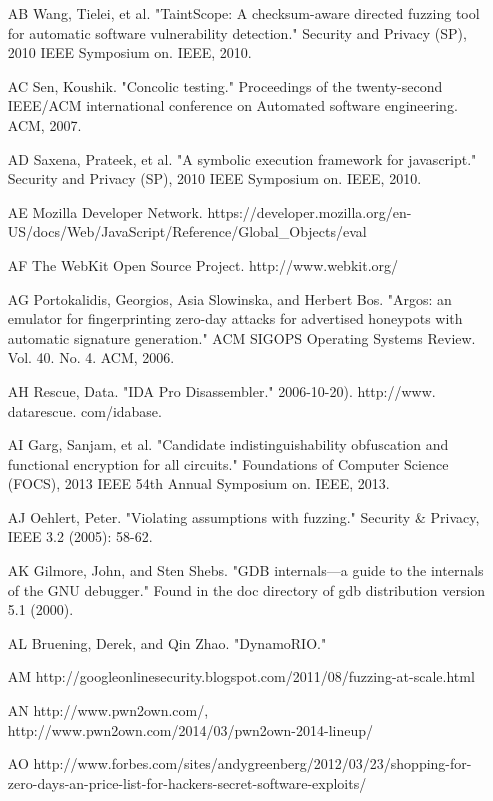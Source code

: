 \documentclass[11pt,expanded,copyright]{fsuthesis}
\begin{document}
\begin{itemize}
	\item [AB] Wang, Tielei, et al. "TaintScope: A checksum-aware directed fuzzing tool for automatic software vulnerability detection." Security and Privacy (SP), 2010 IEEE Symposium on. IEEE, 2010.
	\item [AC] Sen, Koushik. "Concolic testing." Proceedings of the twenty-second IEEE/ACM international conference on Automated software engineering. ACM, 2007.
	\item [AD] Saxena, Prateek, et al. "A symbolic execution framework for javascript." Security and Privacy (SP), 2010 IEEE Symposium on. IEEE, 2010.
	\item [AE] Mozilla Developer Network. https://developer.mozilla.org/en-US/docs/Web/JavaScript/Reference/Global\_Objects/eval
	\item [AF] The WebKit Open Source Project. http://www.webkit.org/
	\item [AG] Portokalidis, Georgios, Asia Slowinska, and Herbert Bos. "Argos: an emulator for fingerprinting zero-day attacks for advertised honeypots with automatic signature generation." ACM SIGOPS Operating Systems Review. Vol. 40. No. 4. ACM, 2006.
	\item [AH] Rescue, Data. "IDA Pro Disassembler." 2006-10-20). http://www. datarescue. com/idabase.
	\item [AI] Garg, Sanjam, et al. "Candidate indistinguishability obfuscation and functional encryption for all circuits." Foundations of Computer Science (FOCS), 2013 IEEE 54th Annual Symposium on. IEEE, 2013.
	\item [AJ] Oehlert, Peter. "Violating assumptions with fuzzing." Security \& Privacy, IEEE 3.2 (2005): 58-62.
	\item [AK] Gilmore, John, and Sten Shebs. "GDB internals—a guide to the internals of the GNU debugger." Found in the doc directory of gdb distribution version 5.1 (2000).
	\item [AL] Bruening, Derek, and Qin Zhao. "DynamoRIO."	
	\item [AM] http://googleonlinesecurity.blogspot.com/2011/08/fuzzing-at-scale.html
	\item [AN] http://www.pwn2own.com/, http://www.pwn2own.com/2014/03/pwn2own-2014-lineup/
	\item [AO] http://www.forbes.com/sites/andygreenberg/2012/03/23/shopping-for-zero-days-an-price-list-for-hackers-secret-software-exploits/
	

\end{itemize}
\end{document}
